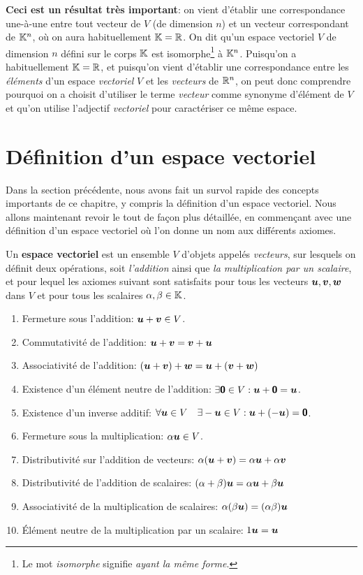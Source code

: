 \textbf{Ceci est un résultat très important}: on vient d'établir une correspondance une-à-une entre tout
vecteur de $V$ (de dimension $n$) et un vecteur correspondant de $\mathbb{K}^n$, où on aura habituellement $\mathbb{K} = \mathbb{R}$.
On dit qu'un espace vectoriel $V$ de dimension $n$ défini sur le corps $\mathbb{K}$ 
est isomorphe\footnote{Le mot \textit{isomorphe} signifie \textit{ayant la même forme}.} à $\mathbb{K}^n$.
Puisqu'on a habituellement $\mathbb{K} = \mathbb{R}$, et puisqu'on vient d'établir une correspondance entre
les \textit{éléments} d'un espace \textit{vectoriel} $V$ et les \textit{vecteurs} de $\mathbb{R}^n$, on peut donc
comprendre pourquoi on a choisit d'utiliser le terme \textit{vecteur} comme synonyme d'élément de $V$
et qu'on utilise l'adjectif \textit{vectoriel} pour caractériser ce même espace.


\section{Définition d'un espace vectoriel}

Dans la section précédente, nous avons fait un survol rapide des concepts importants
de ce chapitre, y compris la définition d'un espace vectoriel. 
Nous allons maintenant revoir le tout de façon plus détaillée, en commençant avec
une définition d'un espace vectoriel où l'on donne un nom aux différents axiomes.
\begin{defini}
Un \textbf{espace vectoriel} est un ensemble $V$ d'objets appelés \textit{vecteurs}, sur lesquels on définit
deux opérations, soit \textit{l'addition} ainsi que \textit{la multiplication par un scalaire}, et pour lequel
les axiomes suivant sont satisfaits pour tous les vecteurs $\boldsymbol{u}, \boldsymbol{v}, \boldsymbol{w}$ dans $V$
et pour tous les scalaires $\alpha, \beta \in \mathbb{K}$.
\begin{enumerate}
\item Fermeture sous l'addition: $\boldsymbol{u}+\boldsymbol{v}\in V$.
\item Commutativité de l'addition: $\boldsymbol{u} + \boldsymbol{v} = \boldsymbol{v} + \boldsymbol{u}$
\item Associativité de l'addition: $ (\boldsymbol{u} + \boldsymbol{v}) + \boldsymbol{w} = \boldsymbol{u} + (\boldsymbol{v} + \boldsymbol{w})$
\item Existence d'un élément neutre de l'addition: $\exists\mbox{\textsf{\textbf{{0}}}}\in V:  \boldsymbol{u} + \mbox{\textsf{\textbf{{0}}}} = \boldsymbol{u}$.
\item Existence d'un inverse additif: $\forall \boldsymbol{u}\in V\quad \exists-\boldsymbol{u}\in V: \boldsymbol{u} + (-\boldsymbol{u}) = \mbox{\textsf{\textbf{{0}}}}$.
\item Fermeture sous la multiplication: $\alpha\boldsymbol{u} \in V$.
\item Distributivité sur l'addition de vecteurs: $\alpha(\boldsymbol{u} + \boldsymbol{v}) = \alpha\boldsymbol{u} + \alpha\boldsymbol{v}$
\item Distributivité de l'addition de scalaires: $ (\alpha + \beta)\boldsymbol{u} = \alpha\boldsymbol{u} + \beta\boldsymbol{u}$
\item Associativité de la multiplication de scalaires: $\alpha(\beta\boldsymbol{u}) = (\alpha\beta)\boldsymbol{u}$
\item Élément neutre de la multiplication par un scalaire: $1\boldsymbol{u} = \boldsymbol{u}$
\end{enumerate}
\end{defini}

